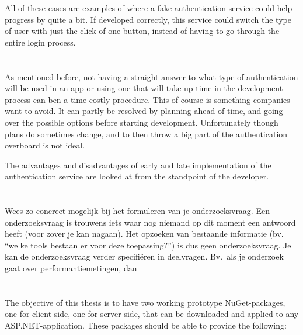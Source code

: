 All of these cases are examples of where a fake authentication service could help progress by quite a bit. If developed correctly, this service could switch the type of user with just the click of one button, instead of having to go through the entire login process.

\section{}%
\label{sec:probleemstelling}

As mentioned before, not having a straight answer to what type of authentication will be used in an app or using one that will take up time in the development process can ben a time costly procedure. This of course is something companies want to avoid. It can partly be resolved by planning ahead of time, and going over the possible options before starting development. Unfortunately though plans do sometimes change, and to then throw a big part of the authentication overboard is not ideal.

The advantages and disadvantages of early and late implementation of the authentication service are looked at from the standpoint of the developer.

\section{}%
\label{sec:onderzoeksvraag}


Wees zo concreet mogelijk bij het formuleren van je onderzoeksvraag. Een onderzoeksvraag is trouwens iets waar nog niemand op dit moment een antwoord heeft (voor zover je kan nagaan). Het opzoeken van bestaande informatie (bv. ``welke tools bestaan er voor deze toepassing?'') is dus geen onderzoeksvraag. Je kan de onderzoeksvraag verder specifiëren in deelvragen. Bv.~als je onderzoek gaat over performantiemetingen, dan 

\section{}%
\label{sec:onderzoeksdoelstelling}

The objective of this thesis is to have two working prototype NuGet-packages, one for client-side, one for server-side, that can be downloaded and applied to any ASP.NET-application. These packages should be able to provide the following:


